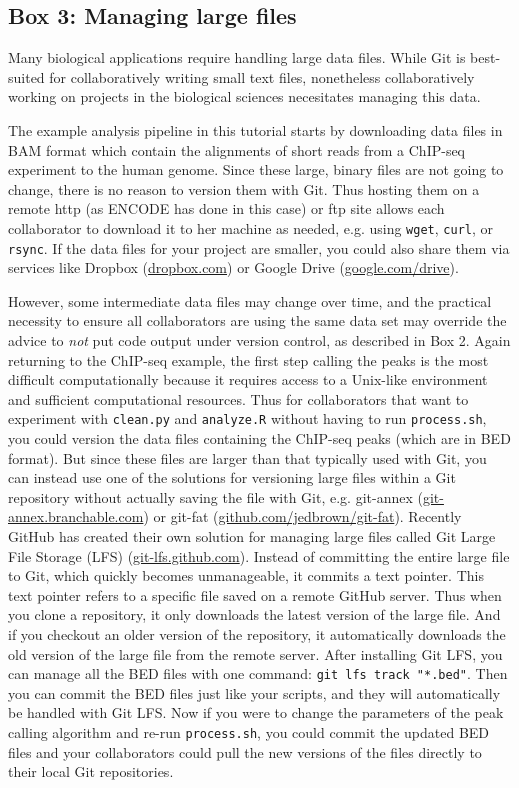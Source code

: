 \subsection{Box 3: Managing large files}

Many biological applications require handling large data files.
While Git is best-suited for collaboratively writing small text files, nonetheless collaboratively working on projects in the biological sciences necesitates managing this data.

The example analysis pipeline in this tutorial starts by downloading data files in BAM format which contain the alignments of short reads from a ChIP-seq experiment to the human genome.
Since these large, binary files are not going to change, there is no reason to version them with Git.
Thus hosting them on a remote http (as ENCODE has done in this case) or ftp site allows each collaborator to download it to her machine as needed, e.g. using \verb|wget|, \verb|curl|, or \verb|rsync|.
If the data files for your project are smaller, you could also share them via services like Dropbox (\href{www.dropbox.com}{dropbox.com}) or Google Drive (\href{https://www.google.com/drive/}{google.com/drive}).

However, some intermediate data files may change over time, and the practical necessity to ensure all collaborators are using the same data set may override the advice to \textit{not} put code output under version control, as described in Box 2.
Again returning to the ChIP-seq example, the first step calling the peaks is the most difficult computationally because it requires access to a Unix-like environment and sufficient computational resources.
Thus for collaborators that want to experiment with \verb|clean.py| and \verb|analyze.R| without having to run \verb|process.sh|, you could version the data files containing the ChIP-seq peaks (which are in BED format).
But since these files are larger than that typically used with Git, you can instead use one of the solutions for versioning large files within a Git repository without actually saving the file with Git, e.g. git-annex (\href{https://git-annex.branchable.com/}{git-annex.branchable.com}) or git-fat (\href{https://github.com/jedbrown/git-fat/}{github.com/jedbrown/git-fat}).
Recently GitHub has created their own solution for managing large files called Git Large File Storage (LFS) (\href{https://git-lfs.github.com/}{git-lfs.github.com}).
Instead of committing the entire large file to Git, which quickly becomes unmanageable, it commits a text pointer.
This text pointer refers to a specific file saved on a remote GitHub server.
Thus when you clone a repository, it only downloads the latest version of the large file.
And if you checkout an older version of the repository, it automatically downloads the old version of the large file from the remote server.
After installing Git LFS, you can manage all the BED files with one command: \verb|git lfs track "*.bed"|.
Then you can commit the BED files just like your scripts, and they will automatically be handled with Git LFS.
Now if you were to change the parameters of the peak calling algorithm and re-run \verb|process.sh|, you could commit the updated BED files and your collaborators could pull the new versions of the files directly to their local Git repositories.
